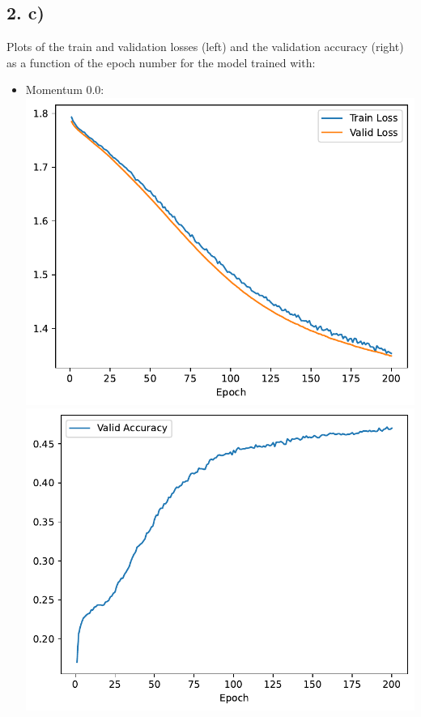 \documentclass[12pt,a4paper]{article}
\begin{document}
    \subsection{2. c)}
        Plots of the train and validation losses (left) and the validation accuracy (right) as a function of the epoch number for the model trained with:
        \begin{itemize}
            \item Momentum 0.0: \\
                \includegraphics[width=\imagewidth]{q2/q2_2c_momentum_0.0-training-loss.pdf}
                \includegraphics[width=\imagewidth]{q2/q2_2c_momentum_0.0-validation-accuracy.pdf} \\

\end{itemize}
\end{document}
